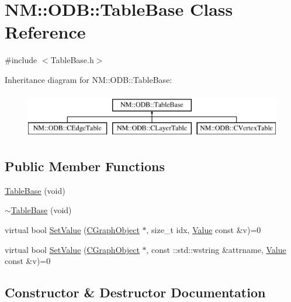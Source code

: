 \hypertarget{class_n_m_1_1_o_d_b_1_1_table_base}{}\section{N\+M\+:\+:O\+D\+B\+:\+:Table\+Base Class Reference}
\label{class_n_m_1_1_o_d_b_1_1_table_base}


{\ttfamily \#include $<$Table\+Base.\+h$>$}

Inheritance diagram for N\+M\+:\+:O\+D\+B\+:\+:Table\+Base\+:\begin{figure}[H]
\begin{center}
\leavevmode
\includegraphics[height=2.000000cm]{class_n_m_1_1_o_d_b_1_1_table_base}
\end{center}
\end{figure}
\subsection*{Public Member Functions}
\begin{DoxyCompactItemize}
\item 
\hyperlink{class_n_m_1_1_o_d_b_1_1_table_base_a14bbb3fa911bf761577ac277cbec2fb3}{Table\+Base} (void)
\item 
\hyperlink{class_n_m_1_1_o_d_b_1_1_table_base_aa87f8c3ccff845bd464f0baa02bb507e}{$\sim$\+Table\+Base} (void)
\item 
virtual bool \hyperlink{class_n_m_1_1_o_d_b_1_1_table_base_afbc340c36e140f2a8184d2585cc3b5d5}{Set\+Value} (\hyperlink{class_n_m_1_1_o_d_b_1_1_c_graph_object}{C\+Graph\+Object} $\ast$, size\+\_\+t idx, \hyperlink{class_n_m_1_1_o_d_b_1_1_value}{Value} const \&v)=0
\item 
virtual bool \hyperlink{class_n_m_1_1_o_d_b_1_1_table_base_a3e55bfe64ccdf81e6a96941b3f9a5fb4}{Set\+Value} (\hyperlink{class_n_m_1_1_o_d_b_1_1_c_graph_object}{C\+Graph\+Object} $\ast$, const \+::std\+::wstring \&attrname, \hyperlink{class_n_m_1_1_o_d_b_1_1_value}{Value} const \&v)=0
\end{DoxyCompactItemize}


\subsection{Constructor \& Destructor Documentation}
\hypertarget{class_n_m_1_1_o_d_b_1_1_table_base_a14bbb3fa911bf761577ac277cbec2fb3}{}
